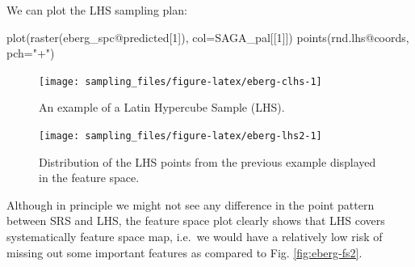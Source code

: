 \documentclass[
  graybox,natbib,nospthms]{svmono}
\newenvironment{Shaded}{\begin{snugshade}}{\end{snugshade}}
\newcommand{\AttributeTok}[1]{\textcolor[rgb]{0.61,0.61,0.61}{#1}}
\newcommand{\DecValTok}[1]{\textcolor[rgb]{0.06,0.06,0.06}{#1}}
\newcommand{\FunctionTok}[1]{\textcolor[rgb]{0,0,0}{#1}}
\newcommand{\NormalTok}[1]{#1}
\newcommand{\OtherTok}[1]{\textcolor[rgb]{0.37,0.37,0.37}{#1}}
\newcommand{\SpecialCharTok}[1]{\textcolor[rgb]{0,0,0}{#1}}
\newcommand{\StringTok}[1]{\textcolor[rgb]{0.5,0.5,0.5}{#1}}
\begin{document}
We can plot the LHS sampling plan:

\begin{Shaded}
\begin{Highlighting}[]
\FunctionTok{plot}\NormalTok{(}\FunctionTok{raster}\NormalTok{(eberg\_spc}\SpecialCharTok{@}\NormalTok{predicted[}\DecValTok{1}\NormalTok{]), }\AttributeTok{col=}\NormalTok{SAGA\_pal[[}\DecValTok{1}\NormalTok{]])}
\FunctionTok{points}\NormalTok{(rnd.lhs}\SpecialCharTok{@}\NormalTok{coords, }\AttributeTok{pch=}\StringTok{"+"}\NormalTok{)}
\end{Highlighting}
\end{Shaded}

\begin{figure}

{\centering \texttt{[image: sampling\_files/figure-latex/eberg-clhs-1]} 

}

\caption{An example of a Latin Hypercube Sample (LHS).}\label{fig:eberg-clhs}
\end{figure}

\begin{Shaded}
\end{Shaded}

\begin{figure}

{\centering \texttt{[image: sampling\_files/figure-latex/eberg-lhs2-1]} 

}

\caption{Distribution of the LHS points from the previous example displayed in the feature space.}\label{fig:eberg-lhs2}
\end{figure}

Although in principle we might not see any difference in the point pattern between
SRS and LHS, the feature space plot clearly shows that LHS covers systematically
feature space map, i.e.~we would have a relatively low risk of missing out some
important features as compared to Fig. \ref{fig:eberg-fs2}.
\end{document}
